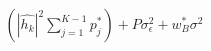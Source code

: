 \documentclass[preview]{standalone}
\begin{document}
\begin{align*}
\left(\left|\hat{h_k}\right|^2 \sum_{j=1}^{K-1} {p_j^\ast}\right) + P \sigma_{\epsilon}^2 + w_B^\ast \sigma^2
\end{align*}
\end{document}
